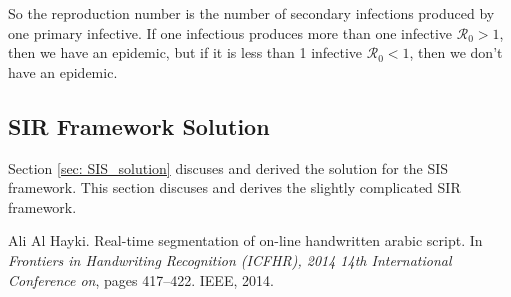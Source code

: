\documentclass[fontsize=17pt]{article}
\begin{document}
So the reproduction number is the number of secondary infections produced by one primary infective. If one infectious produces more than one infective $\mathscr{R}_{0}>1$, then we have an epidemic, but if it is less than 1 infective $\mathscr{R}_{0}<1$, then we don't have an epidemic.

\subsection{SIR Framework Solution}
Section \ref{sec: SIS_solution} discuses and derived the solution for the SIS framework. This section discuses and derives the slightly complicated SIR framework. 




 

\begin{thebibliography}{1}
	
	Ali Al Hayki.
	\newblock Real-time segmentation of on-line handwritten arabic script.
	\newblock In {\em Frontiers in Handwriting Recognition (ICFHR), 2014 14th
		International Conference on}, pages 417--422. IEEE, 2014.
	
\end{thebibliography}
\appendix
\end{document}
